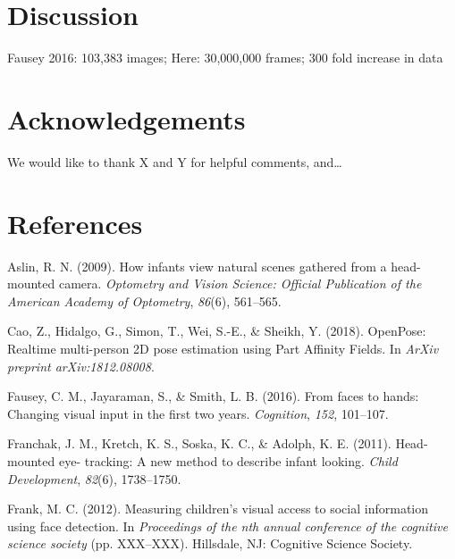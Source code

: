 \documentclass[10pt, letterpaper]{article}
\begin{document}
\hypertarget{discussion}{%
\section{Discussion}\label{discussion}}

Fausey 2016: 103,383 images; Here: 30,000,000 frames; 300 fold increase
in data

\hypertarget{acknowledgements}{%
\section{Acknowledgements}\label{acknowledgements}}

We would like to thank X and Y for helpful comments, and\ldots{}

\hypertarget{references}{%
\section{References}\label{references}}

\setlength{\parindent}{-0.1in} 
\setlength{\leftskip}{0.125in}

\noindent

\hypertarget{refs}{}
\leavevmode\hypertarget{ref-Aslin2009}{}%
Aslin, R. N. (2009). How infants view natural scenes gathered from a
head-mounted camera. \emph{Optometry and Vision Science: Official
Publication of the American Academy of Optometry}, \emph{86}(6),
561--565.

\leavevmode\hypertarget{ref-Cao2018openpose}{}%
Cao, Z., Hidalgo, G., Simon, T., Wei, S.-E., \& Sheikh, Y. (2018).
OpenPose: Realtime multi-person 2D pose estimation using Part Affinity
Fields. In \emph{ArXiv preprint arXiv:1812.08008}.

\leavevmode\hypertarget{ref-Fausey2016}{}%
Fausey, C. M., Jayaraman, S., \& Smith, L. B. (2016). From faces to
hands: Changing visual input in the first two years. \emph{Cognition},
\emph{152}, 101--107.

\leavevmode\hypertarget{ref-Franchak2011}{}%
Franchak, J. M., Kretch, K. S., Soska, K. C., \& Adolph, K. E. (2011).
Head-mounted eye- tracking: A new method to describe infant looking.
\emph{Child Development}, \emph{82}(6), 1738--1750.

\leavevmode\hypertarget{ref-Frank2012}{}%
Frank, M. C. (2012). Measuring children's visual access to social
information using face detection. In \emph{Proceedings of the nth annual
conference of the cognitive science society} (pp. XXX--XXX). Hillsdale,
NJ: Cognitive Science Society.
\end{document}
